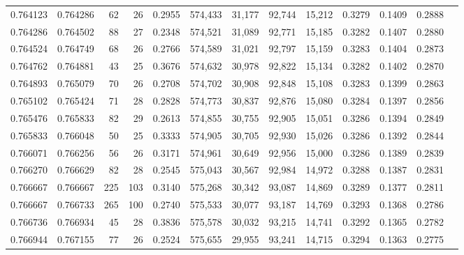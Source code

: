 \begin{tabular}{rrrrrrrrrrrrr}
0.764123 & 0.764286 &     62 &    26 &                                     0.2955 & 574,433 &  31,177 &  92,744 &  15,212 & 0.3279 & 0.1409 & 0.2888 \\
0.764286 & 0.764502 &     88 &    27 &                                     0.2348 & 574,521 &  31,089 &  92,771 &  15,185 & 0.3282 & 0.1407 & 0.2880 \\
0.764524 & 0.764749 &     68 &    26 &                                     0.2766 & 574,589 &  31,021 &  92,797 &  15,159 & 0.3283 & 0.1404 & 0.2873 \\
0.764762 & 0.764881 &     43 &    25 &                                     0.3676 & 574,632 &  30,978 &  92,822 &  15,134 & 0.3282 & 0.1402 & 0.2870 \\
0.764893 & 0.765079 &     70 &    26 &                                     0.2708 & 574,702 &  30,908 &  92,848 &  15,108 & 0.3283 & 0.1399 & 0.2863 \\
0.765102 & 0.765424 &     71 &    28 &                                     0.2828 & 574,773 &  30,837 &  92,876 &  15,080 & 0.3284 & 0.1397 & 0.2856 \\
0.765476 & 0.765833 &     82 &    29 &                                     0.2613 & 574,855 &  30,755 &  92,905 &  15,051 & 0.3286 & 0.1394 & 0.2849 \\
0.765833 & 0.766048 &     50 &    25 &                                     0.3333 & 574,905 &  30,705 &  92,930 &  15,026 & 0.3286 & 0.1392 & 0.2844 \\
0.766071 & 0.766256 &     56 &    26 &                                     0.3171 & 574,961 &  30,649 &  92,956 &  15,000 & 0.3286 & 0.1389 & 0.2839 \\
0.766270 & 0.766629 &     82 &    28 &                                     0.2545 & 575,043 &  30,567 &  92,984 &  14,972 & 0.3288 & 0.1387 & 0.2831 \\
0.766667 & 0.766667 &    225 &   103 &                                     0.3140 & 575,268 &  30,342 &  93,087 &  14,869 & 0.3289 & 0.1377 & 0.2811 \\
0.766667 & 0.766733 &    265 &   100 &                                     0.2740 & 575,533 &  30,077 &  93,187 &  14,769 & 0.3293 & 0.1368 & 0.2786 \\
0.766736 & 0.766934 &     45 &    28 &                                     0.3836 & 575,578 &  30,032 &  93,215 &  14,741 & 0.3292 & 0.1365 & 0.2782 \\
0.766944 & 0.767155 &     77 &    26 &                                     0.2524 & 575,655 &  29,955 &  93,241 &  14,715 & 0.3294 & 0.1363 & 0.2775 \\

\end{tabular}
